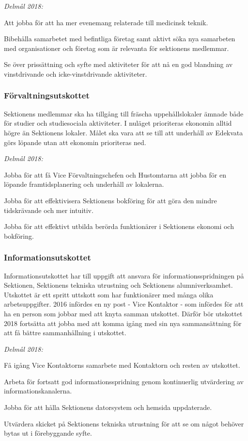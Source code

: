 \documentclass[../_main/handlingar.tex]{subfiles}
\begin{document}
\emph{Delmål 2018:}
\begin{dashlist}
	\item Att jobba för att ha mer evenemang relaterade till medicinsk teknik.
	\item Bibehålla samarbetet med befintliga företag samt aktivt söka nya samarbeten med organisationer och företag som är relevanta för sektionens medlemmar.
	\item Se över prissättning och syfte med aktiviteter för att nå en god blandning av vinstdrivande och icke-vinstdrivande aktiviteter.
\end{dashlist}
\newpage
\subsubsection*{Förvaltningsutskottet}
Sektionens medlemmar ska ha tillgång till fräscha uppehållslokaler ämnade både för studier och studiesociala aktiviteter. I nuläget prioriteras ekonomin alltid högre än Sektionens lokaler. Målet ska vara att se till att underhåll av Edekvata görs löpande utan att ekonomin prioriteras ned.

\emph{Delmål 2018:}
\begin{dashlist}
	\item Jobba för att få Vice Förvaltningschefen och Hustomtarna att jobba för en löpande framtidsplanering och underhåll av lokalerna.
	\item Jobba för att effektivisera Sektionens bokföring för att göra den mindre tidskrävande och mer intuitiv.
	\item Jobba för att effektivt utbilda berörda funktionärer i Sektionens ekonomi och bokföring.
\end{dashlist}

\subsubsection*{Informationsutskottet}
Informationsutskottet har till uppgift att ansvara för informationsspridningen på Sektionen, Sektionens tekniska utrustning och Sektionens alumniverksamhet. Utskottet är ett spritt uttskott som har funktionärer med många olika arbetsuppgifter. 2016 infördes en ny post - Vice Kontaktor - som infördes för att ha en person som jobbar med att knyta samman utskottet. Därför bör utskottet 2018 fortsätta att jobba med att komma igång med sin nya sammansättning för att få bättre sammanhållning i utskottet.

\emph{Delmål 2018:}
\begin{dashlist}
	\item Få igång Vice Kontaktorns samarbete med Kontaktorn och resten av utskottet.
	\item Arbeta för fortsatt god informationsspridning genom kontinuerlig utvärdering av informationskanalerna.
	\item Jobba för att hålla Sektionens datorsystem och hemsida uppdaterade.
	\item Utvärdera skicket på Sektionens tekniska utrustning för att se om något behöver bytas ut i förebyggande syfte.
\end{dashlist}
\end{document}
